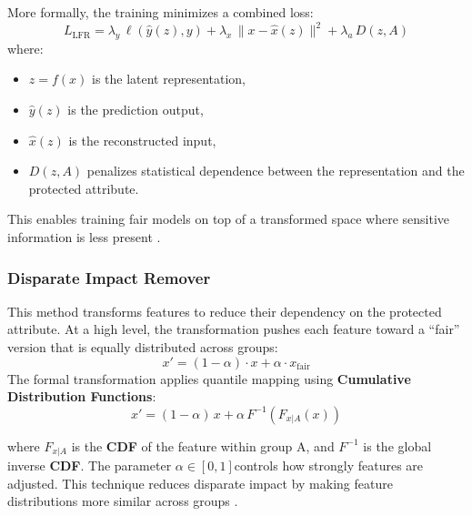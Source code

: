\documentclass[12pt,a4paper,openright,twoside]{book}
\begin{document}
More formally, the training minimizes a combined loss:
\begin{equation}
    {L}_{\text{LFR}} = \lambda_y\, \ell(\hat{y}(z), y) + \lambda_x\, \lVert x - \hat{x}(z) \rVert^2 + \lambda_a\, D(z, A)
\end{equation}
where:
\begin{itemize}
    \item \begin{math}z = f(x)\end{math} is the latent representation,
    \item \begin{math}\hat{y}(z)\end{math} is the prediction output,
    \item \begin{math}\hat{x}(z)\end{math} is the reconstructed input,
    \item \begin{math}D(z, A)\end{math} penalizes statistical dependence between the representation and the protected attribute.
\end{itemize}
This enables training fair models on top of a transformed space where sensitive information is less present \cite{pmlr-v28-zemel13}.


\subsubsection{Disparate Impact Remover} This method transforms features to reduce their dependency on the protected attribute.
At a high level, the transformation pushes each feature toward a “fair” version that is equally distributed across groups:
\begin{equation}
    x' = (1 - \alpha) \cdot x + \alpha \cdot x_{\text{fair}}
\end{equation}
The formal transformation applies quantile mapping using \textbf{Cumulative Distribution Functions}:
\begin{equation}
    x' = (1 - \alpha)\, x + \alpha\, F^{-1}(F_{x|A}(x))
\end{equation}

where \begin{math} F_{x | A} \end{math} is the \textbf{CDF} of the feature within group A, and \begin{math}F^{-1}\end{math} is the global inverse \textbf{CDF}. The parameter \begin{math} \alpha \in [0, 1] \end{math}controls how strongly features are adjusted.
This technique reduces disparate impact by making feature distributions more similar across groups \cite{feldman2015certifyingremovingdisparateimpact}.
\end{document}
